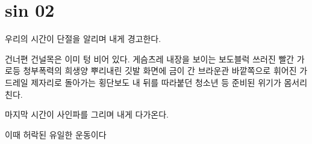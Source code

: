 \hypertarget{sin-02}{%

\chapter{sin 02}\label{sin-02}}



우리의 시간이 단절을 알리며 내게 경고한다.



건너편 건널목은 이미 텅 비어 있다. 게슴츠레 내장을 보이는 보도블럭 쓰러진 빨간 가로등 청부폭력의 희생양 뿌리내린 깃발 화면에 금이 간 브라운관 바깥쪽으로 휘어진 가드레일 제자리로 돌아가는 횡단보도 내 뒤를 따라붙던 청소년 등 준비된 위기가 몸서리친다.



마지막 시간이 사인파를 그리며 내게 다가온다.



이때 허락된 유일한 운동이다

